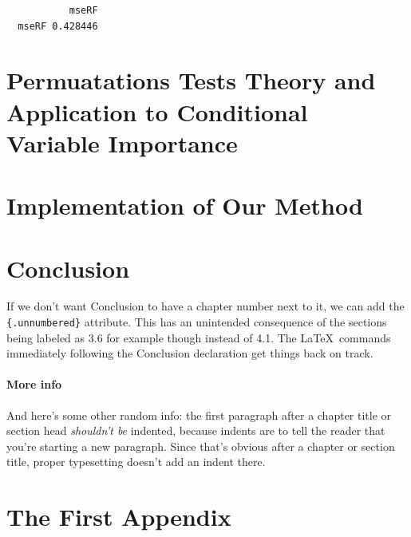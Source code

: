 \documentclass[12pt,twoside]{reedthesis}
\begin{document}
  \begin{Shaded}
  \begin{Highlighting}[]
  \end{Highlighting}
  \end{Shaded}
  
  \begin{verbatim}
           mseRF
  mseRF 0.428446
  \end{verbatim}
  
  \chapter{Permuatations Tests Theory and Application to Conditional
  Variable
  Importance}\label{permuatations-tests-theory-and-application-to-conditional-variable-importance}
  
  \chapter{Implementation of Our
  Method}\label{implementation-of-our-method}
  
  \chapter*{Conclusion}\label{conclusion}
  
  \setcounter{chapter}{4} \setcounter{section}{0}
  
  If we don't want Conclusion to have a chapter number next to it, we can
  add the \texttt{\{.unnumbered\}} attribute. This has an unintended
  consequence of the sections being labeled as 3.6 for example though
  instead of 4.1. The \LaTeX~commands immediately following the Conclusion
  declaration get things back on track.
  
  \subsubsection{More info}\label{more-info}
  
  And here's some other random info: the first paragraph after a chapter
  title or section head \emph{shouldn't be} indented, because indents are
  to tell the reader that you're starting a new paragraph. Since that's
  obvious after a chapter or section title, proper typesetting doesn't add
  an indent there.
  
  \appendix
  
  \chapter{The First Appendix}\label{the-first-appendix}
  
\end{document}
